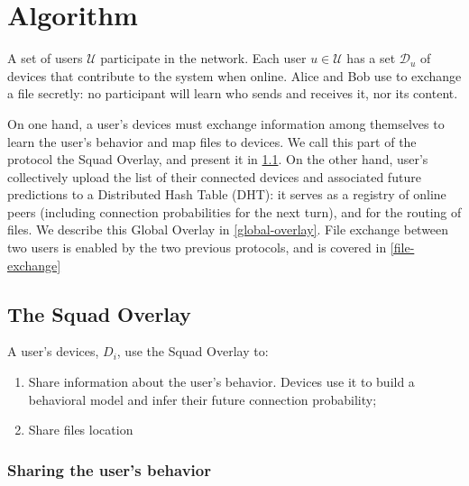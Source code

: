 \section{Algorithm}%
\label{Algorithm}


\newcommand{\Alice}{\ensuremath{\mathscr{A}}}
\newcommand{\Bob}{\ensuremath{\mathscr{B}}}

\newcommand{\localoverlay}{Squad Overlay\xspace}
\newcommand{\globaloverlay}{Global Overlay\xspace}


A set of users $\mathcal{U}$ participate in the \name network.
Each user $u \in \mathcal{U}$ has a set $\mathcal{D}_u$ of devices that contribute to the system when online.
Alice and Bob use \name to exchange a file secretly: no participant will learn who sends and receives it, nor its content.

On one hand, a user's devices must exchange information among themselves to learn the user's behavior  and map files to devices.
We call this part of the protocol the \localoverlay, and present it in 
\cref{local-overlay}. On the other hand, user's collectively upload the list of 
their connected devices and associated future predictions to a Distributed Hash 
Table (DHT): it serves as a registry of online peers (including connection 
probabilities for the next turn), and for the routing of files.
We describe this \globaloverlay in \cref{global-overlay}. File exchange between 
two users is enabled by the two previous protocols, and is covered in 
\cref{file-exchange}

\subsection{The \localoverlay}%
\label{local-overlay}

A user's devices, \(D_i\), use the \localoverlay to:
\begin{enumerate}
	\item Share information about the user's behavior.
	Devices use it to build a behavioral model and infer their future connection probability;
  \item Share files location 
\end{enumerate}

\subsubsection{Sharing the user's behavior}%
\label{ssub:sharing_the_user_s_behavior}

